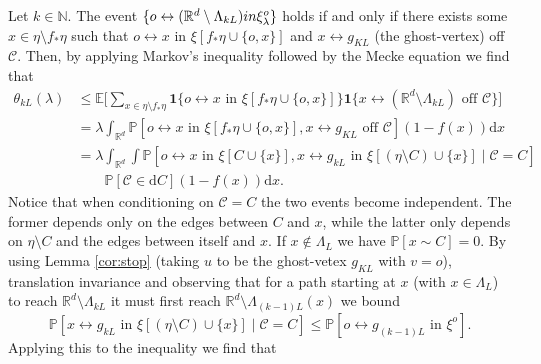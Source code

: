 \documentclass[a4paper,12pt]{scrartcl}
\newcommand{\E}{\mathbb{E}}
\renewcommand{\P}{\mathbb{P}}
\renewcommand{\d}{\mathrm{d}}
\newcommand{\nats}{\mathbb{N}}
\newcommand{\reals}{\mathbb{R}}
\theoremstyle{definition}
\theoremstyle{remark}
\begin{document}
Let $k\in\nats$. The event $\{o\leftrightarrow (\mathbb R^d \setminus \Lambda_{kL}) \textup{ in } \xi_\lambda^o\}$ holds if and only if there exists some
$x\in\eta\setminus f_*\eta$ such that $o\leftrightarrow x$ in
$\xi[f_*\eta\cup\{o,x\}]$ and $x\leftrightarrow g_{KL}$
(the ghost-vertex)
off $\mathcal C$.
Then, by applying Markov's inequality followed by the Mecke equation we find that
\begin{equation}
  \begin{aligned}
    \theta_{kL}(\lambda)
    & \leq
    \E\Big[\sum_{x\in\eta\setminus f_*\eta}
      \mathbf{1}\{o\leftrightarrow x \text{ in } \xi[f_*\eta\cup\{o,x\}]\}
      \mathbf{1}\{x\leftrightarrow
      (\mathbb R^d \setminus \Lambda_{kL}) \text{ off }\mathcal C\}
    \Big]                                        \\
    & =\lambda\int_{\reals^d}
    \P[
      o\leftrightarrow x \text{ in } \xi[f_*\eta\cup\{o,x\}],
      x\leftrightarrow g_{KL} %
      \text{ off } \mathcal C
    ]
    (1-f(x))\d x                                   \\
    & =
    \lambda\int_{\reals^d}\int
    \P[
      o\leftrightarrow x \text{ in } \xi[C\cup \{x\}],
      x\leftrightarrow g_{k L} %
      \text{ in } \xi[(\eta\setminus C)\cup \{x\}]
      \mid
      \mathcal C = C
    ]                                              \\
    & \qquad \P[\mathcal C\in \d C] (1-f(x))\d x.
  \end{aligned}
\end{equation}
Notice that when conditioning on $\mathcal C = C$ the two events become independent. The former depends only on the edges between $C$ and $x$, while the latter only depends on $\eta\setminus C$ and the edges between itself and $x$. If $x\not\in \Lambda_L$ we have $\P[x\sim C] = 0$. By using Lemma \ref{cor:stop}
(taking $u$ to be the ghost-vetex $g_{KL}$ with $v=o$), translation invariance and observing that for a path starting at $x$
(with $x \in \Lambda_L$)
to reach $\mathbb R^d \setminus \Lambda_{kL}$ it must first reach
$\mathbb R^d \setminus \Lambda_{(k-1)L}(x)$ we bound
\begin{equation}
  \P[
    x\leftrightarrow g_{kL}  %
    \text{ in } \xi[(\eta\setminus C)\cup \{x\}]
    \mid
    \mathcal C = C
  ]
  \leq
  \P[o\leftrightarrow g_{(k-1)L} %
  \text{ in } \xi^o].
\end{equation}
Applying this to the inequality we find that
\end{document}
